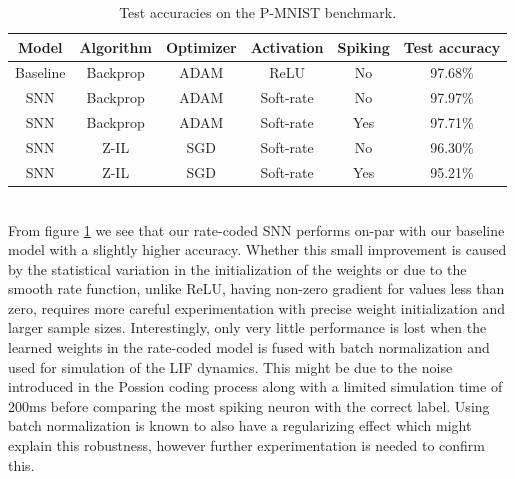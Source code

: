 \documentclass[a4paper,11pt]{article} %
\begin{document}
\begin{table}[ht]
  \centering
  \begin{tabular}{|c | c | c | c | c | c |}
  \hline
  \textbf{Model}   & \textbf{Algorithm}  & \textbf{Optimizer}  & \textbf{Activation}   & \textbf{Spiking}   & \textbf{Test accuracy} \\ \hline
  Baseline         & Backprop                     & ADAM                & ReLU                  & No                 & 97.68\%                \\
  SNN              & Backprop                     & ADAM                & Soft-rate             & No                 & 97.97\%                \\
  SNN              & Backprop                     & ADAM                & Soft-rate             & Yes                & 97.71\%                \\
  SNN              & Z-IL                         & SGD                 & Soft-rate             & No                 & 96.30\%                \\ \hline
  SNN              & Z-IL                         & SGD                 & Soft-rate             & Yes                & 95.21\%                \\ \hline
  \end{tabular}
  \caption{Test accuracies on the P-MNIST benchmark.}
  \label{fig:snn-accuracies}
\end{table} \\
From figure \ref{fig:snn-accuracies} we see that our rate-coded SNN performs on-par with our baseline model with a slightly higher accuracy. Whether this small improvement is caused by the statistical variation in the initialization of the weights or due to the smooth rate function, unlike ReLU, having non-zero gradient for values less than zero, requires more careful experimentation with precise weight initialization and larger sample sizes. Interestingly, only very little performance is lost when the learned weights in the rate-coded model is fused with batch normalization and used for simulation of the LIF dynamics. This might be due to the noise introduced in the Possion coding process along with a limited simulation time of 200ms before comparing the most spiking neuron with the correct label. Using batch normalization is known to also have a regularizing effect \cite{ioffe2015batch} which might explain this robustness, however further experimentation is needed to confirm this. 

\newpage
\end{document}
